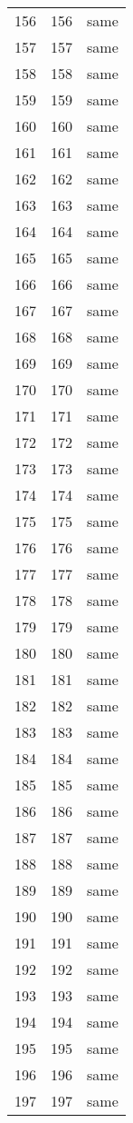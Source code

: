 \documentclass{article}%
\begin{document}
\begin{longtable}{lrl}
156 &  156 &  same \\
157 &  157 &  same \\
158 &  158 &  same \\
159 &  159 &  same \\
160 &  160 &  same \\
161 &  161 &  same \\
162 &  162 &  same \\
163 &  163 &  same \\
164 &  164 &  same \\
165 &  165 &  same \\
166 &  166 &  same \\
167 &  167 &  same \\
168 &  168 &  same \\
169 &  169 &  same \\
170 &  170 &  same \\
171 &  171 &  same \\
172 &  172 &  same \\
173 &  173 &  same \\
174 &  174 &  same \\
175 &  175 &  same \\
176 &  176 &  same \\
177 &  177 &  same \\
178 &  178 &  same \\
179 &  179 &  same \\
180 &  180 &  same \\
181 &  181 &  same \\
182 &  182 &  same \\
183 &  183 &  same \\
184 &  184 &  same \\
185 &  185 &  same \\
186 &  186 &  same \\
187 &  187 &  same \\
188 &  188 &  same \\
189 &  189 &  same \\
190 &  190 &  same \\
191 &  191 &  same \\
192 &  192 &  same \\
193 &  193 &  same \\
194 &  194 &  same \\
195 &  195 &  same \\
196 &  196 &  same \\
197 &  197 &  same \\

\end{longtable}
\end{document}
